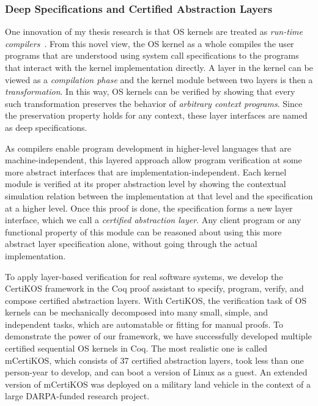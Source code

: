 \documentclass[a4paper, 10pt]{article}
\begin{document}
\begin{small}
\subsubsection*{\small Deep Specifications and Certified Abstraction Layers}
\begin{comment}
Modern OS kernels are designed and constructed using a
stack of \emph{abstraction layers},
each of which defines an interface that hides the underlying implementation
details. Client programs can be understood solely based on the interface,
independent of the layer implementation. Despite their huge contributions
to the computer industry,
abstraction layers have mostly been treated as a system
concept; before our work, they have almost never been formally specified or verified.
\end{comment}
One innovation of my thesis research is that  OS kernels are treated as \emph{run-time compilers}~\cite{popl15-gu}.
From this novel view,
the OS kernel as a whole compiles the
user programs that are understood using system call specifications  to the programs that interact 
with the kernel implementation directly.
A layer in the kernel can be viewed as a \emph{compilation phase}
and the kernel module between two layers  is then a \emph{transformation}.
In this way,  OS kernels can be verified by showing that
every such transformation
preserves the behavior of \emph{arbitrary context programs}.
Since the preservation property holds for any context,
these layer interfaces are named
as deep specifications. 


As compilers enable program development
in higher-level languages that are machine-independent,
this layered approach allow program verification 
at some more abstract interfaces that are implementation-independent. Each kernel module is verified
at its proper abstraction level by showing the contextual
simulation relation between the implementation at that level
and the specification at a higher level.
Once this proof is done, the specification forms a new layer interface, which we call a \emph{certified abstraction layer}.
Any client program or any functional property of this module
can be reasoned about using this more abstract  layer specification alone, without going through the actual implementation.

To apply layer-based verification for real software systems,
we develop the CertiKOS framework in the Coq proof assistant
to specify, program, verify, and compose certified abstraction
layers. With CertiKOS, the verification task of OS kernels
can be mechanically decomposed into many small, simple, and
independent tasks, which are automatable or fitting for manual proofs.
To demonstrate the power of our framework,
 we have successfully developed multiple certified
sequential OS kernels in Coq. 
The most realistic one is called mCertiKOS,
which consists of 37 certified abstraction layers, 
took less than one person-year to develop,
and can boot a version of Linux as a guest.
An extended version of mCertiKOS was deployed on a military land vehicle in the context of a large DARPA-funded research project.


\end{small}
\end{document}
